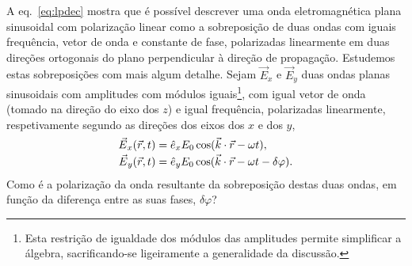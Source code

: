 A eq.~\eqref{eq:lpdec} mostra que é possível descrever uma onda eletromagnética
plana sinusoidal com polarização linear como a sobreposição de duas ondas com
iguais frequência, vetor de onda e constante de fase, polarizadas linearmente em
duas direções ortogonais do plano perpendicular à direção de propagação.
Estudemos estas sobreposições com mais algum detalhe. Sejam $\vec E_x$ e $\vec
E_y$ duas ondas planas sinusoidais com amplitudes com módulos iguais\footnote{Esta
restrição de igualdade dos módulos das amplitudes permite simplificar a álgebra,
sacrificando-se ligeiramente a generalidade da discussão.}, com igual
vetor de onda (tomado na direção do eixo dos $z$) e igual frequência,
polarizadas linearmente, respetivamente segundo as direções dos eixos dos $x$ e
dos $y$,
\begin{align*}
\vec E_x(\vec r,t)&=\he_x E_0\cos(\vec k\cdot\vec r-\omega t),\\
\vec E_y(\vec r,t)&=\he_y E_0\cos(\vec k\cdot\vec r-\omega t - \delta\varphi).
\end{align*}
Como é a polarização da onda resultante da sobreposição destas duas ondas, em
função da diferença entre as suas fases, $\delta\varphi$?

